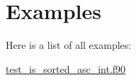 \section{Examples}
Here is a list of all examples\-:\begin{DoxyCompactItemize}
\item 
\hyperlink{test_is_sorted_asc_int_8f90-example}{test\-\_\-is\-\_\-sorted\-\_\-asc\-\_\-int.\-f90}
\end{DoxyCompactItemize}
